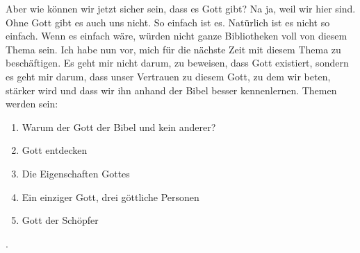 \begin{otsblock}
        Aber wie können wir jetzt sicher sein, dass es Gott gibt? Na ja, weil wir hier sind. Ohne Gott gibt es auch uns nicht. So einfach ist es. Natürlich ist es nicht so einfach. Wenn es einfach wäre, würden nicht ganze Bibliotheken voll von diesem Thema sein. Ich habe nun vor, mich für die nächste Zeit mit diesem Thema zu beschäftigen. Es geht mir nicht darum, zu beweisen, dass Gott existiert, sondern es geht mir darum, dass unser Vertrauen zu diesem Gott, zu dem wir beten, stärker wird und dass wir ihn anhand der Bibel besser kennenlernen.
        Themen werden sein:
        \begin{enumerate}
            \item Warum der Gott der Bibel und kein anderer?
            \item Gott entdecken
            \item Die Eigenschaften Gottes
            \item Ein einziger Gott, drei göttliche Personen
            \item Gott der Schöpfer
        \end{enumerate}
        
    \end{otsblock}
    \begin{otsblock}[Ende]
    \end{otsblock}
    .